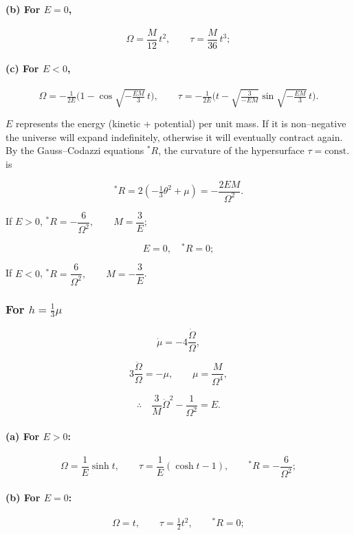 \paragraph{(b) For $E=0$,}
\[
\Omega = \frac{M}{12}\,t^{2}, 
\qquad 
\tau = \frac{M}{36}\,t^{3};
\]

\paragraph{(c) For $E<0$,}
\[
\Omega = -\tfrac{1}{2E}\Big(1 - \cos \sqrt{-\tfrac{E M}{3}}\,t \Big), 
\qquad 
\tau = -\tfrac{1}{2E}\Big(t - \sqrt{\tfrac{3}{-E M}} \sin \sqrt{-\tfrac{E M}{3}}\,t \Big).
\]

\medskip
$E$ represents the energy (kinetic + potential) per unit mass.  
If it is non–negative the universe will expand indefinitely, otherwise it will eventually contract again.
By the Gauss–Codazzi equations $^{*}R$, the curvature of the 
hypersurface $\tau = \text{const.}$ is  

\[
^{*}R = 2\left(-\tfrac{1}{3}\theta^{2} + \mu\right)
      = -\frac{2 E M}{\Omega^{2}}.
\]

If $E > 0$, \quad $^{*}R = -\dfrac{6}{\Omega^{2}}, \qquad M = \dfrac{3}{E}$;

\[
E = 0, \quad {}^{*}R = 0;
\]

If \(E < 0\), \quad
\({}^{*}R = \dfrac{6}{\Omega^{2}}, \qquad M = -\dfrac{3}{E}\).


\subsubsection*{For $h = \tfrac{1}{3}\mu$}

\[
\dot{\mu} = -4\frac{\dot{\Omega}}{\Omega},
\]

\[
3\frac{\ddot{\Omega}}{\Omega} = -\mu, 
\qquad \mu = \frac{M}{\Omega^{4}},
\]

\[
\therefore \quad \frac{3}{M}\dot{\Omega}^{2} - \frac{1}{\Omega^{2}} = E.
\]

\paragraph{(a) For $E > 0$:}
\[
\Omega = \frac{1}{E}\sinh t, 
\qquad \tau = \frac{1}{E}(\cosh t - 1), 
\qquad {}^{*}R = -\frac{6}{\Omega^{2}};
\]

\paragraph{(b) For $E = 0$:}
\[
\Omega = t, 
\qquad \tau = \tfrac{1}{2}t^{2}, 
\qquad {}^{*}R = 0;
\]

